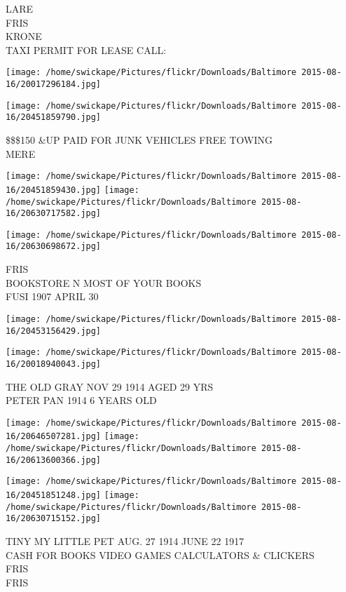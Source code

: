 \documentclass[10pt,letterpaper]{article}
\begin{document}
LARE\\
FRIS\\
KRONE\\
TAXI PERMIT FOR LEASE CALL:
\pagebreak

\texttt{[image: /home/swickape/Pictures/flickr/Downloads/Baltimore 2015-08-16/20017296184.jpg]}

\vspace{0.25in}
\texttt{[image: /home/swickape/Pictures/flickr/Downloads/Baltimore 2015-08-16/20451859790.jpg]}

\$\$\$150 \&UP PAID FOR JUNK VEHICLES FREE TOWING\\
MERE
\pagebreak

\texttt{[image: /home/swickape/Pictures/flickr/Downloads/Baltimore 2015-08-16/20451859430.jpg]}
\texttt{[image: /home/swickape/Pictures/flickr/Downloads/Baltimore 2015-08-16/20630717582.jpg]}

\vspace{0.25in}
\texttt{[image: /home/swickape/Pictures/flickr/Downloads/Baltimore 2015-08-16/20630698672.jpg]}

FRIS\\
BOOKSTORE N MOST OF YOUR BOOKS\\
FUSI 1907 APRIL 30
\pagebreak

\texttt{[image: /home/swickape/Pictures/flickr/Downloads/Baltimore 2015-08-16/20453156429.jpg]}

\vspace{0.25in}
\texttt{[image: /home/swickape/Pictures/flickr/Downloads/Baltimore 2015-08-16/20018940043.jpg]}

THE OLD GRAY NOV 29 1914 AGED 29 YRS\\
PETER PAN 1914 6 YEARS OLD
\pagebreak

\texttt{[image: /home/swickape/Pictures/flickr/Downloads/Baltimore 2015-08-16/20646507281.jpg]}
\texttt{[image: /home/swickape/Pictures/flickr/Downloads/Baltimore 2015-08-16/20613600366.jpg]}

\texttt{[image: /home/swickape/Pictures/flickr/Downloads/Baltimore 2015-08-16/20451851248.jpg]}
\texttt{[image: /home/swickape/Pictures/flickr/Downloads/Baltimore 2015-08-16/20630715152.jpg]}

TINY MY LITTLE PET AUG. 27 1914 JUNE 22 1917\\
CASH FOR BOOKS VIDEO GAMES CALCULATORS \& CLICKERS\\
FRIS\\
FRIS
\pagebreak
\end{document}
